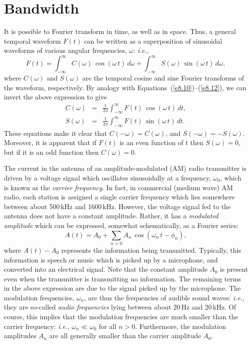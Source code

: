 \section{Bandwidth}\label{s8.3}
It is possible to 
Fourier transform in time, as well as in space. Thus, a general temporal waveform $F(t)$
can be written as a superposition of sinusoidal waveforms of various angular
frequencies, $\omega$: {\em i.e.}, 
\begin{equation}
F(t) = \int_{-\infty}^\infty C(\omega)\,\cos(\omega\,t)\,d\omega + \int_{-\infty}^{\infty}
S(\omega)\,\sin(\omega\,t)\,d\omega,
\end{equation}
where $C(\omega)$ and $S(\omega)$ are the temporal cosine and sine Fourier
transforms of the waveform, respectively. By analogy with Equations~(\ref{e8.10})--(\ref{e8.12}), we can invert the above expression to give
\begin{eqnarray}
C(\omega)&=&\frac{1}{2\pi}\int_{-\infty}^\infty F(t)\,\cos(\omega\,t)\,dt,\\[0.5ex]
S(\omega)&=&\frac{1}{2\pi}\int_{-\infty}^\infty F(t)\,\sin(\omega\,t)\,dt.
\end{eqnarray}
These equations make it clear that $C(-\omega)=C(\omega)$, and $S(-\omega)=-S(\omega)$. Moreover, it is apparent that if $F(t)$ is an even function of $t$ then
$S(\omega)=0$, but if it is an odd function then $C(\omega)=0$. 

The current in the antenna of an amplitude-modulated (AM) radio transmitter
is driven by a voltage signal which oscillates sinusoidally at a frequency, $\omega_0$, 
which is known as the {\em carrier frequency}. In fact, in commercial (medium wave) AM radio,
each station is assigned a single carrier frequency which lies somewhere between
about 500\,kHz and 1600\,kHz. However, the voltage signal fed to the antenna does not have
a constant amplitude. Rather, it has a {\em modulated amplitude}\/ which can be expressed,
somewhat schematically, as a Fourier series:
\begin{equation}
A(t) = A_0 + \sum_{n>0} A_n\,\cos(\omega_n\,t-\phi_n),
\end{equation}
where $A(t)-A_0$ represents the information being transmitted. Typically,
this information is speech or music which is picked up by a microphone, and
converted into an electrical signal.
Note that the constant amplitude $A_0$ is present even when the transmitter is
transmitting no information. The remaining terms in the above expression
are due to the signal picked up by the microphone. The modulation
frequencies, $\omega_n$, are thus the frequencies of audible sound waves: {\em i.e.}, they are so-called {\em audio frequencies}\/ lying between about 20\,Hz and 20\,kHz. 
Of course, this implies that the modulation frequencies are much smaller than the carrier frequency:
{\em i.e.}, $\omega_n\ll \omega_0$ for all $n>0$. Furthermore, the modulation
amplitudes $A_n$ are all generally smaller than the carrier amplitude $A_0$. 

